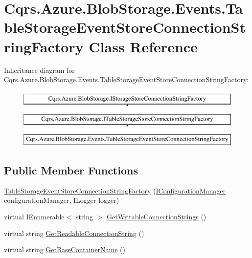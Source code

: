 \hypertarget{classCqrs_1_1Azure_1_1BlobStorage_1_1Events_1_1TableStorageEventStoreConnectionStringFactory}{}\section{Cqrs.\+Azure.\+Blob\+Storage.\+Events.\+Table\+Storage\+Event\+Store\+Connection\+String\+Factory Class Reference}
\label{classCqrs_1_1Azure_1_1BlobStorage_1_1Events_1_1TableStorageEventStoreConnectionStringFactory}
Inheritance diagram for Cqrs.\+Azure.\+Blob\+Storage.\+Events.\+Table\+Storage\+Event\+Store\+Connection\+String\+Factory\+:\begin{figure}[H]
\begin{center}
\leavevmode
\includegraphics[height=3.000000cm]{classCqrs_1_1Azure_1_1BlobStorage_1_1Events_1_1TableStorageEventStoreConnectionStringFactory}
\end{center}
\end{figure}
\subsection*{Public Member Functions}
\begin{DoxyCompactItemize}
\item 
\hyperlink{classCqrs_1_1Azure_1_1BlobStorage_1_1Events_1_1TableStorageEventStoreConnectionStringFactory_a48d61b35856515a2bfb0674c1fa57995}{Table\+Storage\+Event\+Store\+Connection\+String\+Factory} (\hyperlink{interfaceCqrs_1_1Configuration_1_1IConfigurationManager}{I\+Configuration\+Manager} configuration\+Manager, I\+Logger logger)
\item 
virtual I\+Enumerable$<$ string $>$ \hyperlink{classCqrs_1_1Azure_1_1BlobStorage_1_1Events_1_1TableStorageEventStoreConnectionStringFactory_a07406c2607bdd42dd13116b92fc6b665}{Get\+Writable\+Connection\+Strings} ()
\item 
virtual string \hyperlink{classCqrs_1_1Azure_1_1BlobStorage_1_1Events_1_1TableStorageEventStoreConnectionStringFactory_a047e58aa30e97231dc913df350bc2446}{Get\+Readable\+Connection\+String} ()
\item 
virtual string \hyperlink{classCqrs_1_1Azure_1_1BlobStorage_1_1Events_1_1TableStorageEventStoreConnectionStringFactory_a118388598a7fa653122fc11521c915d7}{Get\+Base\+Container\+Name} ()
\end{DoxyCompactItemize}
